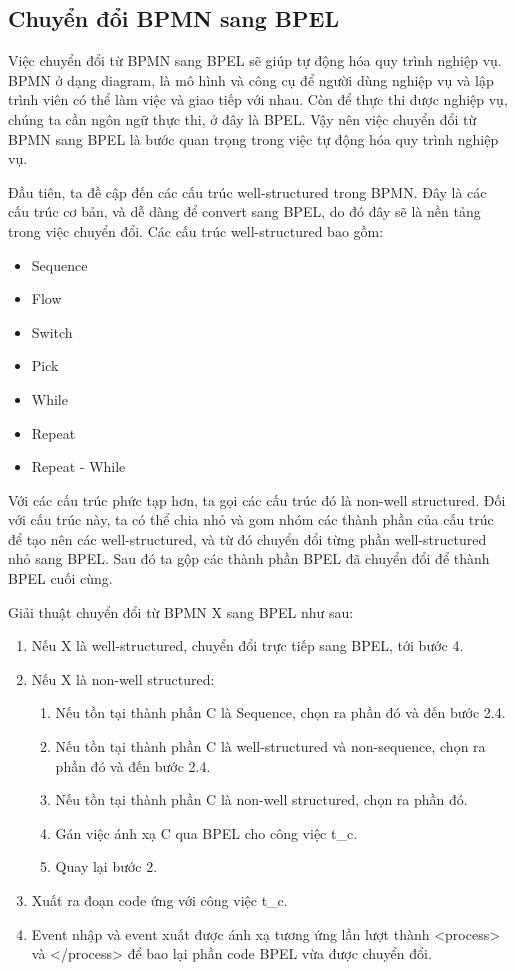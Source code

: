 \subsection{Chuyển đổi BPMN sang BPEL}
\par Việc chuyển đổi từ BPMN sang BPEL sẽ giúp tự động hóa quy trình nghiệp vụ. BPMN ở dạng diagram, là mô hình và công cụ để người dùng nghiệp vụ và lập trình viên có thể làm việc và giao tiếp với nhau. 
Còn để thực thi được nghiệp vụ, chúng ta cần ngôn ngữ thực thi, ở đây là BPEL. Vậy nên việc chuyển đổi từ BPMN sang BPEL là bước quan trọng trong việc tự động hóa quy trình nghiệp vụ.

\par Đầu tiên, ta đề cập đến các cấu trúc well-structured trong BPMN. Đây là các cấu trúc cơ bản, và dễ dàng để convert sang BPEL, do đó đây sẽ là nền tảng trong việc chuyển đổi. Các cấu trúc well-structured bao gồm:
\begin{itemize}
	\item Sequence
	\item Flow
	\item Switch
	\item Pick
	\item While
	\item Repeat
	\item Repeat - While
\end{itemize}

\par Với các cấu trúc phức tạp hơn, ta gọi các cấu trúc đó là non-well structured. Đối với cấu trúc này, ta có thể chia nhỏ và gom nhóm các thành phần của cấu trúc để tạo nên các well-structured, và từ đó chuyển đổi từng phần well-structured nhỏ sang BPEL. 
Sau đó ta gộp các thành phần BPEL đã chuyển đổi để thành BPEL cuối cùng.

\par Giải thuật chuyển đổi từ BPMN X sang BPEL như sau:
\begin{enumerate}
	\item Nếu X là well-structured, chuyển đổi trực tiếp sang BPEL, tới bước 4.
	\item Nếu X là non-well structured:
	\begin{enumerate}
		\item Nếu tồn tại thành phần C là Sequence, chọn ra phần đó và đến bước 2.4.
		\item Nếu tồn tại thành phần C là well-structured và non-sequence, chọn ra phần đó và đến bước 2.4.
		\item Nếu tồn tại thành phần C là non-well structured, chọn ra phần đó.
		\item Gán việc ánh xạ C qua BPEL cho công việc t\_{c}.
		\item Quay lại bước 2.
	\end{enumerate}
	\item Xuất ra đoạn code ứng với công việc t\_{c}.
	\item Event nhập và event xuất được ánh xạ tương ứng lần lượt thành <process> và </process> để bao lại phần code BPEL vừa được chuyển đổi.
\end{enumerate}